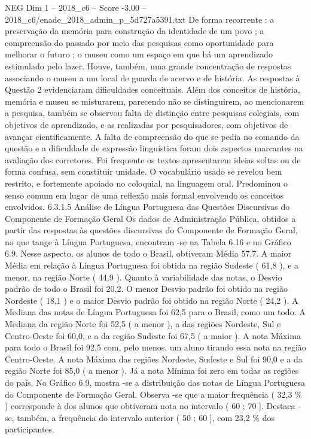 \begin{textsample}{NEG Dim 1 – 2018\_c6 – Score -3.00 – 2018\_c6/enade\_2018\_admin\_p\_5d727a5391.txt}
De forma recorrente : a preservação da memória para construção da identidade de um povo ; a compreensão do passado por meio das pesquisas como oportunidade para melhorar o futuro ; o museu como um espaço em que há um aprendizado estimulado pelo lazer.
Houve, também, uma grande concentração de respostas associando o museu a um local de guarda de acervo e de história.
As respostas à Questão 2 evidenciaram dificuldades conceituais.
Além dos conceitos de história, memória e museu se misturarem, parecendo não se distinguirem, ao mencionarem a pesquisa, também se observou falta de distinção entre pesquisas colegiais, com objetivos de aprendizado, e as realizadas por pesquisadores, com objetivos de avançar cientificamente.
A falta de compreensão do que se pedia no comando da questão e a dificuldade de expressão linguística foram dois aspectos marcantes na avaliação dos corretores.
Foi frequente os textos apresentarem ideias soltas ou de forma confusa, sem constituir unidade.
O vocabulário usado se revelou bem restrito, e fortemente apoiado no coloquial, na linguagem oral.
Predominou o senso comum em lugar de uma reflexão mais formal envolvendo os conceitos envolvidos. 6.3.1.5 Análise de Língua Portuguesa das Questões Discursivas do Componente de Formação Geral Os dados de Administração Pública, obtidos a partir das respostas às questões discursivas do Componente de Formação Geral, no que tange à Língua Portuguesa, encontram -se na Tabela 6.16 e no Gráfico 6.9.
Nesse aspecto, os alunos de todo o Brasil, obtiveram Média 57,7.
A maior Média em relação à Língua Portuguesa foi obtida na região Sudeste ( 61,8 ), e a menor, na região Norte ( 44,9 ).
Quanto à variabilidade das notas, o Desvio padrão de todo o Brasil foi 20,2.
O menor Desvio padrão foi obtido na região Nordeste ( 18,1 ) e o maior Desvio padrão foi obtido na região Norte ( 24,2 ).
A Mediana das notas de Língua Portuguesa foi 62,5 para o Brasil, como um todo.
A Mediana da região Norte foi 52,5 ( a menor ), a das regiões Nordeste, Sul e Centro-Oeste foi 60,0, e a da região Sudeste foi 67,5 ( a maior ).
A nota Máxima para todo o Brasil foi 92,5 com, pelo menos, um aluno tirando essa nota na região Centro-Oeste.
A nota Máxima das regiões Nordeste, Sudeste e Sul foi 90,0 e a da região Norte foi 85,0 ( a menor ).
Já a nota Mínima foi zero em todas as regiões do país.
No Gráfico 6.9, mostra -se a distribuição das notas de Língua Portuguesa do Componente de Formação Geral.
Observa -se que a maior frequência ( 32,3 \% ) corresponde à dos alunos que obtiveram nota no intervalo ( 60 ; 70 ].
Destaca -se, também, a frequência do intervalo anterior ( 50 ; 60 ], com 23,2 \% dos participantes.

\end{textsample}
